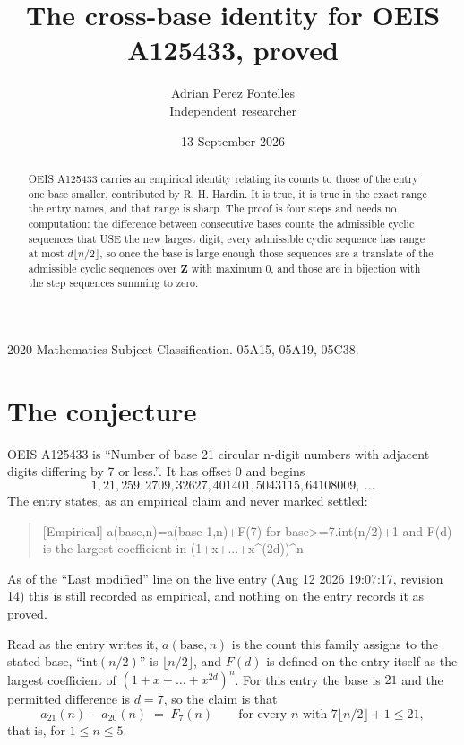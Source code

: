\documentclass[11pt,a4paper]{article}
\title{The cross-base identity for OEIS A125433, proved}
\author{Adrian Perez Fontelles\\ \small Independent researcher}
\date{13 September 2026}
\theoremstyle{plain}
\theoremstyle{definition}
\begin{document}
\maketitle

\begin{abstract}
OEIS A125433 carries an empirical identity relating its counts to those of the entry one base
smaller, contributed by R. H. Hardin. It is true, it is true in the exact range the entry
names, and that range is sharp. The proof is four steps and needs no computation: the
difference between consecutive bases counts the admissible cyclic sequences that USE the new
largest digit, every admissible cyclic sequence has range at most $d\lfloor n/2\rfloor$, so
once the base is large enough those sequences are a translate of the admissible cyclic
sequences over $\mathbf{Z}$ with maximum $0$, and those are in bijection with the step
sequences summing to zero.
\end{abstract}

\noindent\small 2020 Mathematics Subject Classification. 05A15, 05A19, 05C38.\normalsize

\section{The conjecture}

OEIS A125433 is ``Number of base 21 circular n-digit numbers with adjacent digits differing by 7 or less.''. It has offset $0$ and begins
\[
1, 21, 259, 2709, 32627, 401401, 5043115, 64108009,\ \dots
\]
The entry states, as an empirical claim and never marked settled:
\begin{quote}
[Empirical] a(base,n)=a(base-1,n)+F(7) for base>=7.int(n/2)+1 and F(d) is the largest coefficient in (1+x+...+x\textasciicircum{}(2d))\textasciicircum{}n
\end{quote}
As of the ``Last modified'' line on the live entry (Aug 12 2026 19:07:17, revision 14)
this is still recorded as empirical, and nothing on the entry records it as proved.

Read as the entry writes it, $a(\mathrm{base},n)$ is the count this family assigns to the
stated base, ``$\mathrm{int}(n/2)$'' is $\lfloor n/2\rfloor$, and $F(d)$ is defined on the
entry itself as the largest coefficient of $(1+x+\dots+x^{2d})^{n}$. For this entry
the base is $21$ and the permitted difference is $d=7$, so the claim is that
\[
a_{21}(n)-a_{20}(n)\;=\;F_{7}(n)
\qquad\text{for every } n \text{ with } 7\lfloor n/2\rfloor+1\le21,
\]
that is, for $1\le n\le5$.
\end{document}
